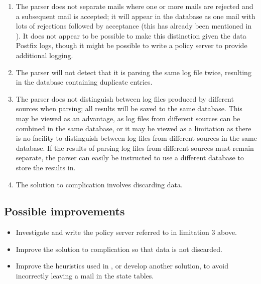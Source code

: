 \begin{enumerate}
    \item The parser does not separate mails where one or more mails are
        rejected and a subsequent mail is accepted; it will appear in the
        database as one mail with lots of rejections followed by acceptance
        (this has already been mentioned in ).
        It does not appear to be possible to make this distinction given
        the data Postfix logs, though it might be possible to write a
        policy server to provide additional logging.

    \item The parser will not detect that it is parsing the same log file
        twice, resulting in the database containing duplicate entries.

    \item The parser does not distinguish between log files produced by
        different sources when parsing; all results will be saved to the
        same database.  This may be viewed as an advantage, as log files
        from different sources can be combined in the same database, or it
        may be viewed as a limitation as there is no facility to
        distinguish between log files from different sources in the same
        database.  If the results of parsing log files from different
        sources must remain separate, the parser can easily be instructed
        to use a different database to store the results in.

    \item The solution to complication  involves discarding data.

\end{enumerate}

\subsection{Possible improvements}

\begin{itemize}

    \item Investigate and write the policy server referred to in limitation
        3 above.

    \item Improve the solution to complication  so that data is not discarded.

    \item Improve the heuristics used in
        , or develop another
        solution, to avoid incorrectly leaving a mail in the state tables.

\end{itemize}


